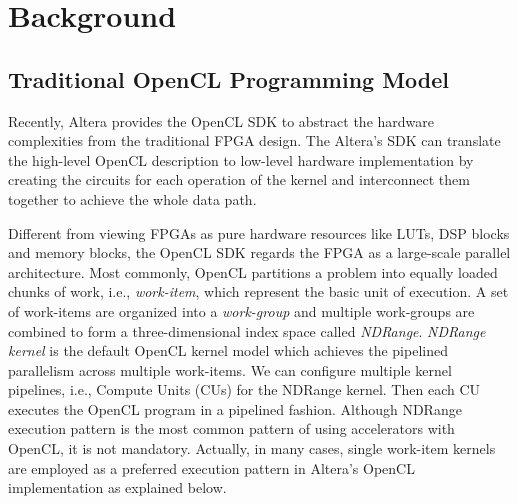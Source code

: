 \section{Background}
\vspace{-1ex}
\subsection{Traditional OpenCL Programming Model}

Recently, Altera provides the OpenCL SDK to abstract the hardware complexities from the traditional FPGA design. The Altera's SDK can translate the high-level OpenCL description to low-level hardware implementation by creating the circuits for each operation of the kernel and interconnect them together to achieve the whole data path.


Different from viewing FPGAs as pure hardware resources like LUTs, DSP blocks and memory blocks, the OpenCL SDK regards the FPGA as a large-scale parallel architecture. Most commonly, OpenCL partitions a problem into equally loaded chunks of work, i.e., \emph{work-item}, which represent the basic unit of execution. A set of work-items are organized into a \emph{work-group} and multiple work-groups are combined to form a three-dimensional index space called \emph{NDRange}. \emph{NDRange kernel} is the default OpenCL kernel model which achieves the pipelined parallelism across multiple work-items. We can configure multiple kernel pipelines, i.e., Compute Units (CUs) for the NDRange kernel. Then each CU executes the OpenCL program in a pipelined fashion. Although NDRange execution pattern is the most common pattern of using accelerators with OpenCL, it is not mandatory. Actually, in many cases, single work-item kernels are employed as a preferred execution pattern in Altera's OpenCL implementation as explained below.


